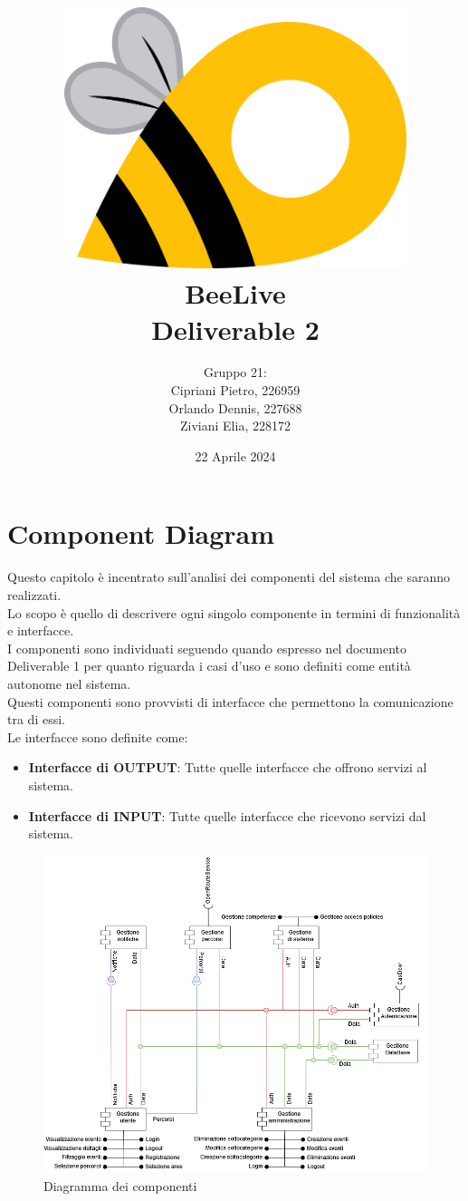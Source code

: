 \documentclass{article}
\title{\includegraphics[width=0.75\textwidth]{Images/BeeLive-Logo.png}\\\vspace{100pt}
\LARGE{\textbf{BeeLive\\Deliverable 2}}}
\author{Gruppo 21:\\
Cipriani Pietro, 226959\\
Orlando Dennis, 227688\\
Ziviani Elia, 228172}
\date{22 Aprile 2024}
\begin{document}
\maketitle
\thispagestyle{firstpage} %
\clearpage

\pagestyle{nonplain} %

\renewcommand{\contentsname}{Indice}
\tableofcontents

\clearpage

\section{Component Diagram}

Questo capitolo è incentrato sull'analisi dei componenti del sistema che saranno realizzati.\\
Lo scopo è quello di descrivere ogni singolo componente in termini di funzionalità e interfacce.\\

I componenti sono individuati seguendo quando espresso nel documento Deliverable 1 per quanto riguarda i casi d'uso e sono definiti come entità autonome nel sistema.\\
Questi componenti sono provvisti di interfacce che permettono la comunicazione tra di essi.\\
Le interfacce sono definite come:
\begin{itemize}
    \item \textbf{Interfacce di OUTPUT}: Tutte quelle interfacce che offrono servizi al sistema.
    \item \textbf{Interfacce di INPUT}: Tutte quelle interfacce che ricevono servizi dal sistema.
\end{itemize} 

\begin{figure}[htbp]
    \centering
    \includegraphics[width=1\textwidth]{Images/ComponentDiagram.png}
    \caption{Diagramma dei componenti}
    \label{fig:component-diagram}
\end{figure}
\end{document}
